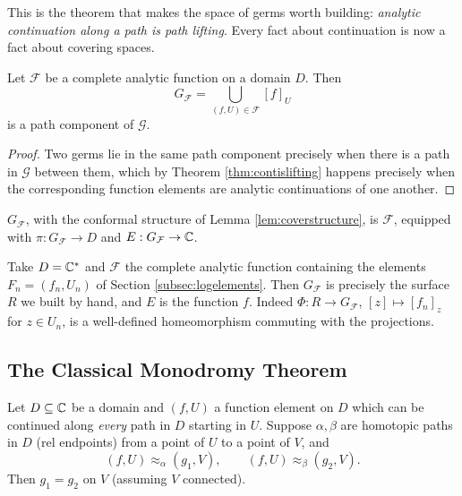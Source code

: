 \documentclass[a4paper]{scrartcl}
\newcommand{\Cs}{\C^*}
\begin{document}
This is the theorem that makes the space of germs worth building: \emph{analytic
continuation along a path is path lifting}. Every fact about continuation is now a fact
about covering spaces.

\begin{corollary}\label{cor:completefn}
	Let $\mathcal{F}$ be a complete analytic function on a domain $D$. Then
	$$
	G_{\mathcal{F}} = \bigcup_{(f,U) \in \mathcal{F}} [f]_U
	$$
	is a path component of $\mathcal{G}$.
\end{corollary}

\begin{proof}
	Two germs lie in the same path component precisely when there is a path in
	$\mathcal{G}$ between them, which by Theorem \ref{thm:contislifting} happens precisely
	when the corresponding function elements are analytic continuations of one another.
\end{proof}

\begin{definition}
	$G_{\mathcal{F}}$, with the conformal structure of Lemma \ref{lem:coverstructure}, is
	 $\mathcal{F}$, equipped
	with $\pi : G_\mathcal{F} \to D$ and $E : G_\mathcal{F} \to \mathbb{C}$.
\end{definition}

\begin{example}
	Take $D = \Cs$ and $\mathcal{F}$ the complete analytic function containing the elements
	$F_n = (f_n, U_n)$ of Section \ref{subsec:logelements}. Then $G_\mathcal{F}$ is
	precisely the surface $R$ we built by hand, and $E$ is the function $f$. Indeed
	$\Phi : R \to G_\mathcal{F}$, $[z] \mapsto [f_n]_z$ for $z \in U_n$, is a well-defined
	homeomorphism commuting with the projections.
\end{example}

\subsection{The Classical Monodromy Theorem}

\begin{theorem}\label{thm:classicalmonodromy}
	Let $D \subseteq \mathbb{C}$ be a domain and $(f, U)$ a function element on $D$ which can be
	continued along \emph{every} path in $D$ starting in $U$. Suppose $\alpha, \beta$ are
	homotopic paths in $D$ (rel endpoints) from a point of $U$ to a point of $V$, and
	$$
	(f, U) \approx_\alpha (g_1, V), \qquad (f,U)\approx_\beta (g_2, V).
	$$
	Then $g_1 = g_2$ on $V$ (assuming $V$ connected).
\end{theorem}
\end{document}
